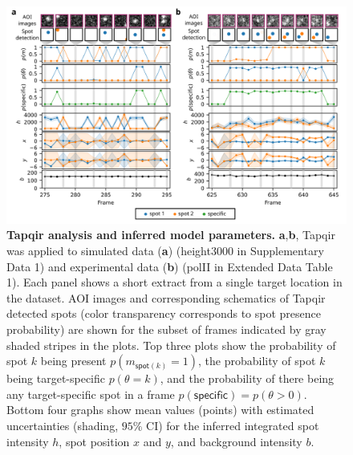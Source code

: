 \begin{figure}[h]
\centering
\includegraphics[width=\textwidth]{figures/figure3/figure3.png}
\caption{\textbf{Tapqir analysis and inferred model parameters.} \textbf{a},\textbf{b}, Tapqir was applied to simulated data (\textbf{a}) (height3000 in Supplementary Data 1) and experimental data (\textbf{b}) (polII in Extended Data Table 1). Each panel shows a short extract from a single target location in the dataset. AOI images and corresponding schematics of Tapqir detected spots (color transparency corresponds to spot presence probability) are shown for the subset of frames indicated by gray shaded stripes in the plots. Top three plots show the probability of spot $k$ being present $p(m_{\mathsf{spot}(k)}=1)$, the probability of spot $k$ being target-specific $p(\theta=k)$, and the probability of there being any target-specific spot in a frame $p(\mathsf{specific}) = p(\theta>0)$.  Bottom four graphs show mean values (points) with estimated uncertainties (shading, $95\%$ CI) for the inferred integrated spot intensity $h$, spot position $x$ and $y$, and background intensity $b$. }
\label{fig:tapqir_analysis}
\end{figure}

